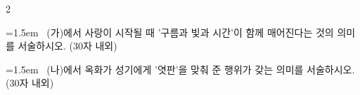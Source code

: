 \documentclass[10pt, a4paper]{article}
\begin{document}
\begin{multicols}{2}
\noindent\begin{minipage}{\columnwidth}
\vspace{2mm}
{\hangindent=1.5em  ~(가)에서 사랑이 시작될 때 '구름과 빛과 시간'이 함께 매어진다는 것의 의미를 서술하시오. (30자 내외)\par}

\vspace{3mm}
\noindent\hrulefill
\vspace{2.5mm}
\noindent\hrulefill
\vspace{2.5mm}
\noindent\hrulefill
\vspace{2.5mm}
\noindent\hrulefill
\vspace{2.5mm}
\noindent\hrulefill
\vspace{2.5mm}
\vspace{1mm}
\vspace{4mm}
\end{minipage}
\par

\noindent\begin{minipage}{\columnwidth}
\vspace{2mm}
{\hangindent=1.5em  ~(나)에서 옥화가 성기에게 '엿판'을 맞춰 준 행위가 갖는 의미를 서술하시오. (30자 내외)\par}

\vspace{3mm}
\noindent\hrulefill
\vspace{2.5mm}
\noindent\hrulefill
\vspace{2.5mm}
\noindent\hrulefill
\vspace{2.5mm}
\noindent\hrulefill
\vspace{2.5mm}
\noindent\hrulefill
\vspace{2.5mm}
\vspace{1mm}
\vspace{4mm}
\end{minipage}
\par


\vspace{1mm}
\vspace{0.5mm}


\end{multicols}
\end{document}
